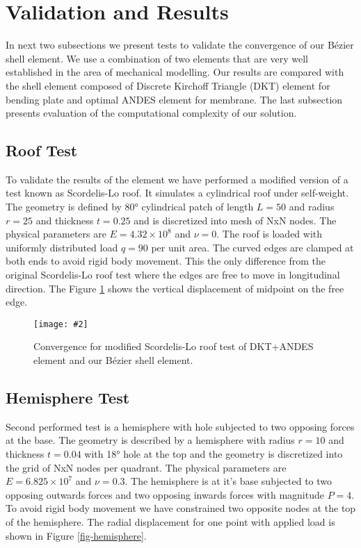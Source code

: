 \documentclass{egpubl}
\newcommand{\Figure}[3]{%
\begin{figure}[htb]
  \centering
  \texttt{[image: \#2]}
  \caption{\label{fig-#2}#3}
\end{figure}}
\begin{document}

\section{Validation and Results} %


In next two subsections we present tests to validate the convergence of our
B\'ezier shell element. We use a combination of two elements that are very well
established in the area of mechanical modelling.
Our results are compared with the shell element
composed of Discrete Kirchoff Triangle (DKT) element \cite{Batoz1980} for bending plate and optimal ANDES element \cite{Felippa2003} for membrane.
The last subsection presents evaluation of the computational complexity of our solution.

\subsection{Roof Test}

To validate the results of the element we have performed a modified version
of a test known as Scordelis-Lo roof. It simulates a cylindrical roof under
self-weight. The geometry is defined by 80° cylindrical patch of length
$L=50$ and radius $r=25$ and thickness $t=0.25$ and is discretized into
mesh of NxN nodes. The physical parameters are $E = 4.32 \times 10^8$ and
$\nu = 0$. The roof is loaded with uniformly distributed load $q = 90$ per
unit area. The curved edges are clamped at both ends to avoid rigid body
movement. This the only difference from the original Scordelis-Lo roof test
where the edges are free to move in longitudinal direction. The Figure
\ref{fig-roof} shows the vertical displacement of midpoint on the free
edge.

\Figure{\linewidth}{roof}
{Convergence for modified Scordelis-Lo roof test of DKT+ANDES element and
our B\'ezier shell element.}


\subsection{Hemisphere Test}

Second performed test is a hemisphere with hole subjected to two opposing
forces at the base. The geometry is described by a hemisphere with radius
$r=10$ and thickness $t=0.04$ with 18° hole at the top and the geometry is
discretized into the grid of NxN nodes per quadrant. The physical
parameters are $E = 6.825 \times 10^7$ and $\nu = 0.3$. The hemisphere is
at it's base subjected to two opposing outwards forces and two opposing
inwards forces with magnitude $P = 4$. To avoid rigid body movement we have
constrained two opposite nodes at the top of the hemisphere. The radial
displacement for one point with applied load is shown in Figure
\ref{fig-hemisphere}.
\end{document}
